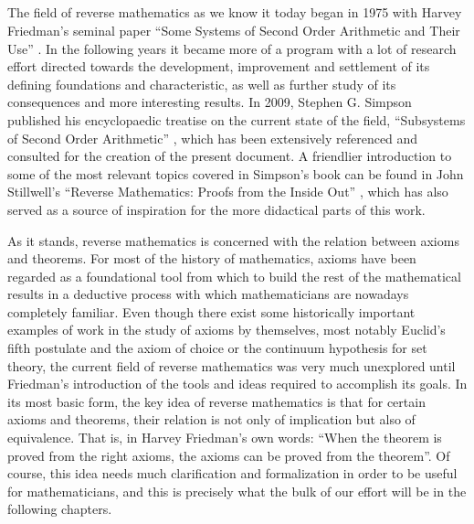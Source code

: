 \documentclass[../main.tex]{memoir}
\begin{document}
\thispagestyle{empty}

\begin{center}
  {\large\bfseries \ProjectTitle}\\
\end{center}

\begin{center}
  \AuthorName\\
  \vspace{0.7cm}
  \\
  \vspace{0.7cm}
  \\
\end{center}

The field of reverse mathematics as we know it today began in 1975 with Harvey Friedman's seminal paper ``Some Systems of Second Order Arithmetic and Their Use'' \cite{friedman}. In the following years it became more of a program with a lot of research effort directed towards the development, improvement and settlement of its defining foundations and characteristic, as well as further study of its consequences and more interesting results. In 2009, Stephen G. Simpson published his encyclopaedic treatise on the current state of the field, ``Subsystems of Second Order Arithmetic'' \cite{simpson}, which has been extensively referenced and consulted for the creation of the present document. A friendlier introduction to some of the most relevant topics covered in Simpson's book can be found in John Stillwell's ``Reverse Mathematics: Proofs from the Inside Out'' \cite{stillwell}, which has also served as a source of inspiration for the more didactical parts of this work.

As it stands, reverse mathematics is concerned with the relation between axioms and theorems. For most of the history of mathematics, axioms have been regarded as a foundational tool from which to build the rest of the mathematical results in a deductive process with which mathematicians are nowadays completely familiar. Even though there exist some historically important examples of work in the study of axioms by themselves, most notably Euclid's fifth postulate and the axiom of choice or the continuum hypothesis for set theory, the current field of reverse mathematics was very much unexplored until Friedman's introduction of the tools and ideas required to accomplish its goals. In its most basic form, the key idea of reverse mathematics is that for certain axioms and theorems, their relation is not only of implication but also of equivalence. That is, in Harvey Friedman's own words: ``When the theorem is proved from the right axioms, the axioms can be proved from the theorem''. Of course, this idea needs much clarification and formalization in order to be useful for mathematicians, and this is precisely what the bulk of our effort will be in the following chapters.
\end{document}
